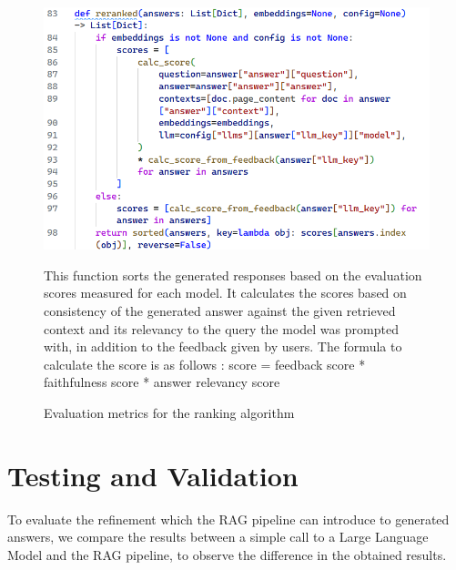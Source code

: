 \begin{figure}[H]
    \centering
    \includegraphics[width=\linewidth]{./figures/ranking-algo.png}
    \caption{Evaluation metrics for the ranking algorithm}
    \begin{flushleft}
        \small This function sorts the generated responses based on the evaluation scores measured for each model. It calculates the scores based on consistency of the generated answer against the given retrieved context and its relevancy to the query the model was prompted with, in addition to the feedback given by users. The formula to calculate the score is as follows :
        score = feedback score * faithfulness score * answer relevancy score
    \end{flushleft}
\end{figure}

\section{Testing and Validation}
To evaluate the refinement which the RAG pipeline can introduce to generated answers, we compare the results between a simple call to a Large Language Model and the RAG pipeline, to observe the difference in the obtained results.
